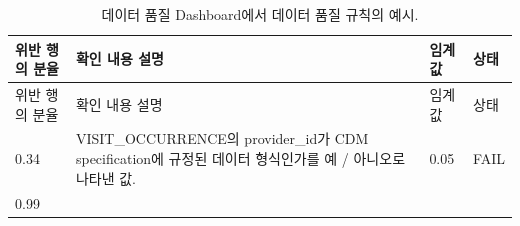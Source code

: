 \documentclass[10.5pt]{book}
\theoremstyle{definition}
\theoremstyle{definition}
\theoremstyle{definition}
\theoremstyle{remark}
\begin{document}
\begin{longtable}[]{@{}llll@{}}
\caption{\label{tab:dqdExamples} 데이터 품질 Dashboard에서 데이터 품질
규칙의 예시.}\tabularnewline
\toprule
\begin{minipage}[b]{0.12\columnwidth}\raggedright\strut
위반 행의 분율\strut
\end{minipage} & \begin{minipage}[b]{0.47\columnwidth}\raggedright\strut
확인 내용 설명\strut
\end{minipage} & \begin{minipage}[b]{0.10\columnwidth}\raggedright\strut
임계값\strut
\end{minipage} & \begin{minipage}[b]{0.07\columnwidth}\raggedright\strut
상태\strut
\end{minipage}\tabularnewline
\midrule
\endfirsthead
\toprule
\begin{minipage}[b]{0.12\columnwidth}\raggedright\strut
위반 행의 분율\strut
\end{minipage} & \begin{minipage}[b]{0.47\columnwidth}\raggedright\strut
확인 내용 설명\strut
\end{minipage} & \begin{minipage}[b]{0.10\columnwidth}\raggedright\strut
임계값\strut
\end{minipage} & \begin{minipage}[b]{0.07\columnwidth}\raggedright\strut
상태\strut
\end{minipage}\tabularnewline
\midrule
\endhead
\begin{minipage}[t]{0.12\columnwidth}\raggedright\strut
0.34\strut
\end{minipage} & \begin{minipage}[t]{0.47\columnwidth}\raggedright\strut
VISIT\_OCCURRENCE의 provider\_id가 CDM specification에 규정된 데이터
형식인가를 예 / 아니오로 나타낸 값.\strut
\end{minipage} & \begin{minipage}[t]{0.10\columnwidth}\raggedright\strut
0.05\strut
\end{minipage} & \begin{minipage}[t]{0.07\columnwidth}\raggedright\strut
FAIL\strut
\end{minipage}\tabularnewline
\begin{minipage}[t]{0.12\columnwidth}\raggedright\strut
0.99\strut
\end{minipage} & \begin{minipage}[t]{0.47\columnwidth}\raggedright\strut

\end{minipage}
\end{longtable}
\end{document}
